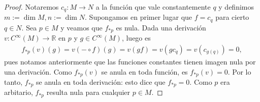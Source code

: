 \documentclass[11pt]{article}
\newcommand{\R}{\mathbb{R}}
\begin{document}
\begin{proof} Notaremos $c_q : M \to N$ a la funci\'on que vale constantemente $q$ y definimos $m := \dim M, n := \dim N$. Supongamos en primer lugar que $f = c_q$ para cierto $q \in N$. Sea $p \in M$ y veamos que $f_{\ast p}$ es nula. Dada una derivaci\'on $v : C^\infty(M) \to \R$ en $p$ y $g \in C^\infty(M)$, luego es
\begin{align*}
f_{\ast p}(v)(g) =  v(- \circ f)(g) = v(gf) = v(gc_q) = v(c_{g(q)}) = 0,
\end{align*}
pues notamos anteriormente que las funciones constantes tienen imagen nula por una derivaci\'on. Como $f_{\ast p}(v)$ se anula en toda funci\'on, es $f_{\ast p}(v) = 0$. Por lo tanto, $f_{\ast p}$ se anula en toda derivaci\'on: esto dice que $f_{\ast p} = 0$. Como $p$ era arbitario, $f_{\ast p}$ resulta nula para cualquier $p \in M$.


\end{proof}
\end{document}
